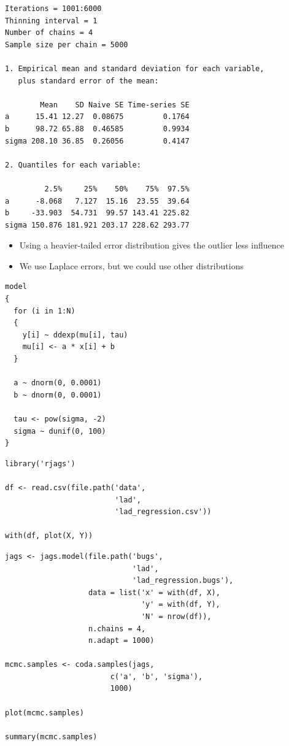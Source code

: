 \documentclass{beamer}
\begin{document}
\begin{frame}[fragile]
  \begin{verbatim}
Iterations = 1001:6000
Thinning interval = 1 
Number of chains = 4 
Sample size per chain = 5000 

1. Empirical mean and standard deviation for each variable,
   plus standard error of the mean:

        Mean    SD Naive SE Time-series SE
a      15.41 12.27  0.08675         0.1764
b      98.72 65.88  0.46585         0.9934
sigma 208.10 36.85  0.26056         0.4147

2. Quantiles for each variable:

         2.5%     25%    50%    75%  97.5%
a      -8.068   7.127  15.16  23.55  39.64
b     -33.903  54.731  99.57 143.41 225.82
sigma 150.876 181.921 203.17 228.62 293.77
  \end{verbatim}
\end{frame}

\frame
{
  \begin{itemize}
    \item{Using a heavier-tailed error distribution gives the outlier less influence}
    \item{We use Laplace errors, but we could use other distributions}
  \end{itemize}
}

\begin{frame}[fragile]
  \begin{verbatim}
model
{
  for (i in 1:N)
  {
    y[i] ~ ddexp(mu[i], tau)
    mu[i] <- a * x[i] + b
  }
  
  a ~ dnorm(0, 0.0001)
  b ~ dnorm(0, 0.0001)
  
  tau <- pow(sigma, -2)
  sigma ~ dunif(0, 100)
}

  \end{verbatim}
\end{frame}

\begin{frame}[fragile]
  \begin{verbatim}
library('rjags')

df <- read.csv(file.path('data',
                         'lad',
                         'lad_regression.csv'))

with(df, plot(X, Y))
  \end{verbatim}
\end{frame}

\begin{frame}[fragile]
  \begin{verbatim}
jags <- jags.model(file.path('bugs',
                             'lad',
                             'lad_regression.bugs'),
                   data = list('x' = with(df, X),
                               'y' = with(df, Y),
                               'N' = nrow(df)),
                   n.chains = 4,
                   n.adapt = 1000)
 
mcmc.samples <- coda.samples(jags,
                        c('a', 'b', 'sigma'),
                        1000)

plot(mcmc.samples)

summary(mcmc.samples)
  \end{verbatim}
\end{frame}
\end{document}
